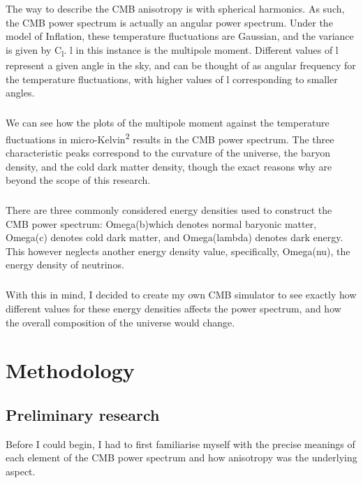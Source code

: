 \documentclass[twoside, fontsize=12pt,
     bibliography=totoc, %
     listof=totoc, %
     index=totoc, %
     onehalfspacing %
]{_MScDiss2017_cls}
\begin{document}
The way to describe the CMB anisotropy is with spherical harmonics. As such, the CMB power spectrum is actually an angular power spectrum. Under the model of Inflation, these temperature fluctuations are Gaussian, and the variance is given by C\textsubscript{l}. l in this instance is the multipole moment. Different values of l represent a given angle in the sky, and can be thought of as angular frequency for the temperature fluctuations, with higher values of l corresponding to smaller angles.

\paragraph{}

We can see how the plots of the multipole moment against the temperature fluctuations in micro-Kelvin\textsuperscript{2} results in the CMB power spectrum. The three characteristic peaks correspond to the curvature of the universe, the baryon density, and the cold dark matter density, though the exact reasons why are beyond the scope of this research.

\paragraph{}

There are three commonly considered energy densities used to construct the CMB power spectrum: Omega(b)which denotes normal baryonic matter, Omega(c) denotes cold dark matter, and Omega(lambda) denotes dark energy. This however neglects another energy density value, specifically, Omega(nu), the energy density of neutrinos. 

\paragraph{}

With this in mind, I decided to create my own CMB simulator to see exactly how different values for these energy densities affects the power spectrum, and how the overall composition of the universe would change.

\chapter{Methodology}

\section{Preliminary research}
Before I could begin, I had to first familiarise myself with the precise meanings of each element of the CMB power spectrum and how anisotropy was the underlying aspect.
\end{document}
